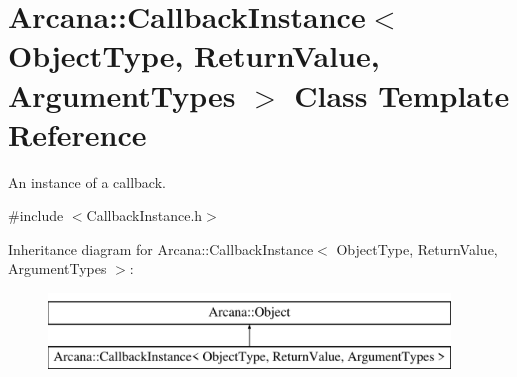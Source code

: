 \hypertarget{class_arcana_1_1_callback_instance}{}\section{Arcana\+:\+:Callback\+Instance$<$ Object\+Type, Return\+Value, Argument\+Types $>$ Class Template Reference}
\label{class_arcana_1_1_callback_instance}


An instance of a callback.  




{\ttfamily \#include $<$Callback\+Instance.\+h$>$}

Inheritance diagram for Arcana\+:\+:Callback\+Instance$<$ Object\+Type, Return\+Value, Argument\+Types $>$\+:\begin{figure}[H]
\begin{center}
\leavevmode
\includegraphics[height=2.000000cm]{class_arcana_1_1_callback_instance}
\end{center}
\end{figure}
